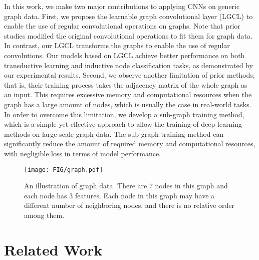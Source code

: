 \documentclass[sigconf]{acmart}
\begin{document}
In this work, we make two major contributions to applying CNNs on
generic graph data. First, we propose the learnable graph
convolutional layer (LGCL) to enable the use of regular
convolutional operations on graphs. Note that prior studies modified
the original convolutional operations to fit them for graph data. In
contrast, our LGCL transforms the graphs to enable the use of
regular convolutions. Our models based on LGCL achieve better
performance on both transductive learning and inductive node
classification tasks, as demonstrated by our experimental results.
Second, we observe another limitation of prior methods; that is,
their training process takes the adjacency matrix of the whole graph
as an input. This requires excessive memory and computational
resources when the graph has a large amount of nodes, which is
usually the case in real-world tasks. In order to overcome this
limitation, we develop a sub-graph training method, which is a
simple yet effective approach to allow the training of deep learning
methods on large-scale graph data. The sub-graph training method can
significantly reduce the amount of required memory and computational
resources, with negligible loss in terms of model performance.

\begin{figure}[t] \texttt{[image: FIG/graph.pdf]}
\caption{An illustration of graph data. There are 7 nodes in this
graph and each node has 3 features. Each node in this graph may have
a different number of neighboring nodes, and there is no relative
order among them.} \label{fig:graph}
\end{figure}


\section{Related Work}\label{sec:related}
\end{document}

